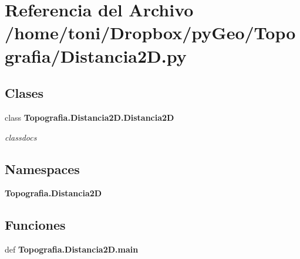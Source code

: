 \section{Referencia del Archivo /home/toni/\-Dropbox/py\-Geo/\-Topografia/\-Distancia2\-D.py}
\label{Distancia2D_8py}
\subsection*{Clases}
\begin{DoxyCompactItemize}
\item 
class {\bf Topografia.\-Distancia2\-D.\-Distancia2\-D}
\begin{DoxyCompactList}\small\item\em classdocs \end{DoxyCompactList}\end{DoxyCompactItemize}
\subsection*{Namespaces}
\begin{DoxyCompactItemize}
\item 
{\bf Topografia.\-Distancia2\-D}
\end{DoxyCompactItemize}
\subsection*{Funciones}
\begin{DoxyCompactItemize}
\item 
def {\bf Topografia.\-Distancia2\-D.\-main}
\end{DoxyCompactItemize}
